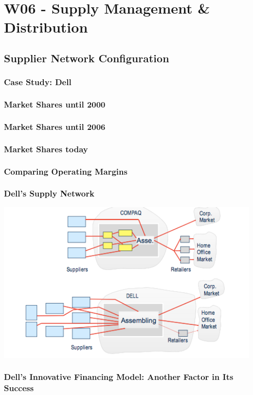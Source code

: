 \section{W06 - Supply Management \& Distribution}
\subsection{Supplier Network Configuration}
\subsubsection{Case Study: Dell}
\subsubsection{Market Shares until 2000}
\subsubsection{Market Shares until 2006}
\subsubsection{Market Shares today}
\subsubsection{Comparing Operating Margins}
\subsubsection{Dell's Supply Network}
\includegraphics[width=1\textwidth]{W06/dellssupplynetwork}
\subsubsection{Dell's Innovative Financing Model: Another Factor in Its Success}
